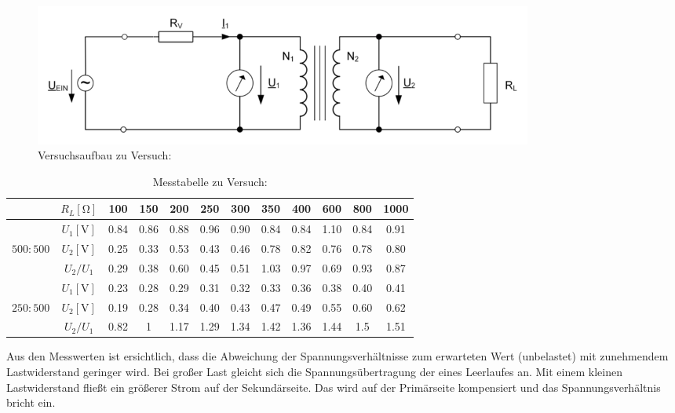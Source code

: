 \documentclass[a4paper]{article}
\begin{document}
\begin{figure}[H]
    \centering
    \includegraphics[width=0.8\textwidth]{versuchsaufbau-2.png}
    \caption{Versuchsaufbau zu Versuch: }
    \label{fig:2-versuchsaufbau}
\end{figure}

\begin{table}[H]
    \centering
    \begin{tabular}{c c *{10}{S[table-format=2.2, tight-spacing=true] }}
         \toprule
         & {$R_L [\si{\ohm}]$} & {100} & {150} & {200} & {250} & {300} & {350} & {400} & {600} & {800} & {1000} \\ 
        \midrule
         & {$U_1[\text{V}]$}                & 0.84 & 0.86 & 0.88 & 0.96 & 0.90 & 0.84 & 0.84 & 1.10 & 0.84 & 0.91\\
        {$500:500$} & {$U_2[\text{V}]$}     & 0.25 & 0.33 & 0.53 & 0.43 & 0.46 & 0.78 & 0.82 & 0.76 & 0.78 & 0.80\\
         & {$U_2/U_1$}                      & 0.29 & 0.38 & 0.60 & 0.45 & 0.51 & 1.03 & 0.97 & 0.69 & 0.93 & 0.87 \\
        \midrule
         & {$U_1[\text{V}]$}                & 0.23 & 0.28 & 0.29 & 0.31 & 0.32 & 0.33 & 0.36 & 0.38 & 0.40 & 0.41\\
        {$250:500$} & {$U_2[\text{V}]$}     & 0.19 & 0.28 & 0.34 & 0.40 & 0.43 & 0.47 & 0.49 & 0.55 & 0.60 & 0.62\\
         & {$U_2/U_1$} 
         & 0.82 & 1 &1.17 & 1.29 & 1.34 & 1.42 & 1.36 & 1.44 & 1.5 & 1.51 \\
        \bottomrule
    \end{tabular}
    \caption{Messtabelle zu Versuch: }
    \label{tab:2-messtab}
\end{table}

Aus den Messwerten ist ersichtlich, dass die Abweichung der Spannungsverhältnisse zum erwarteten Wert (unbelastet) mit zunehmendem Lastwiderstand geringer wird. Bei großer Last gleicht sich die Spannungsübertragung der eines Leerlaufes an. Mit einem kleinen Lastwiderstand  fließt ein größerer Strom auf der Sekundärseite. Das wird auf der Primärseite kompensiert und das Spannungsverhältnis bricht ein.
\end{document}

